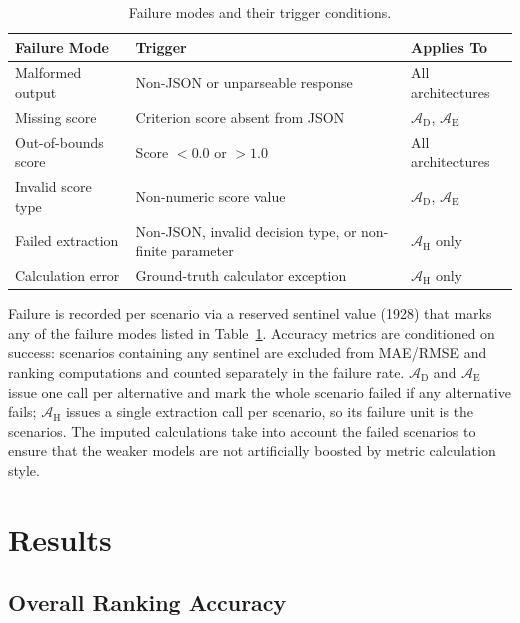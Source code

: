 \documentclass[final,3p,times]{elsarticle}
\begin{document}
\begin{table}[H]
\begin{threeparttable}
\small
\centering
\caption{Failure modes and their trigger conditions.}
\label{tab:failure-modes}
\begin{tabular}{lll}
\toprule
Failure Mode & Trigger & Applies To \\
\midrule
Malformed output & Non-JSON or unparseable response & All architectures \\
Missing score & Criterion score absent from JSON & $\mathcal{A}_{\text{D}}$, $\mathcal{A}_{\text{E}}$ \\
Out-of-bounds score & Score $< 0.0$ or $> 1.0$ & All architectures \\
Invalid score type & Non-numeric score value & $\mathcal{A}_{\text{D}}$, $\mathcal{A}_{\text{E}}$ \\
Failed extraction & Non-JSON, invalid decision type, or non-finite parameter & $\mathcal{A}_{\text{H}}$ only \\
Calculation error & Ground-truth calculator exception & $\mathcal{A}_{\text{H}}$ only \\
\bottomrule
\end{tabular}
\end{threeparttable}
\end{table}

Failure is recorded per scenario via a reserved sentinel value (1928) that marks any of the failure modes listed in Table~\ref{tab:failure-modes}. Accuracy metrics are conditioned on success: scenarios containing any sentinel are excluded from MAE/RMSE and ranking computations and counted separately in the failure rate. $\mathcal{A}_{\text{D}}$ and $\mathcal{A}_{\text{E}}$ issue one call per alternative and mark the whole scenario failed if any alternative fails; $\mathcal{A}_{\text{H}}$ issues a single extraction call per scenario, so its failure unit is the scenarios. The imputed calculations take into account the failed scenarios to ensure that the weaker models are not artificially boosted by metric calculation style.


\FloatBarrier
\section{Results}
\label{sec3}
\label{sec:results}

\FloatBarrier
\subsection{Overall Ranking Accuracy}
\label{sec:res-ranking}
\end{document}

